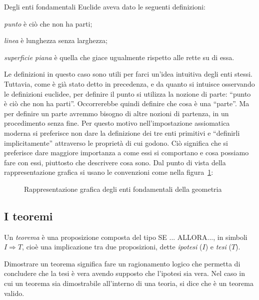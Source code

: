 Degli enti fondamentali Euclide aveva dato le seguenti definizioni:
\begin{itemize*}
\item \emph{punto} è ciò che non ha parti;
\item \emph{linea} è lunghezza senza larghezza;
\item \emph{superficie piana} è quella che giace ugualmente rispetto 
alle rette su di essa.
\end{itemize*}
Le definizioni in questo caso sono utili per farci un'idea intuitiva 
degli enti stessi. Tuttavia, come è già stato detto in precedenza, e 
da quanto si intuisce osservando le definizioni euclidee, per 
definire il punto si utilizza la nozione di parte: ``punto è ciò che 
non ha parti''. Occorrerebbe quindi definire che cosa è una 
``parte''. Ma per definire un parte avremmo bisogno di altre nozioni 
di partenza, in un procedimento senza fine. Per questo motivo 
nell'impostazione assiomatica moderna si preferisce non dare la 
definizione dei tre enti primitivi e ``definirli implicitamente'' 
attraverso le proprietà di cui godono. Ciò significa che si 
preferisce dare maggiore importanza a come essi si comportano e cosa 
possiamo fare con essi, piuttosto che descrivere cosa sono.
Dal punto di vista della rappresentazione grafica si usano le 
convenzioni come nella figura~\ref{fig:1.2}:
% 

\begin{inaccessibleblock}
 \begin{figure}[htb]
 \centering
 \caption{Rappresentazione grafica degli enti fondamentali della 
geometria}\label{fig:1.2}
\end{figure}
\end{inaccessibleblock}

\vspazio\ovalbox{\risolvi \ref{ese:1.32}}


\subsection{I teoremi}

Un \emph{teorema} è una proposizione composta del tipo SE ... ALLORA..., in simboli \(I\Rightarrow 
T\), cioè una implicazione tra due proposizioni, dette \emph{ipotesi} 
(\(I\)) e \emph{tesi} (\(T\)).

Dimostrare un teorema significa fare un ragionamento logico che 
permetta di concludere che la tesi è vera avendo supposto che 
l'ipotesi sia vera. Nel caso in cui un teorema sia dimostrabile 
all'interno di una teoria, si dice che è un teorema valido.

